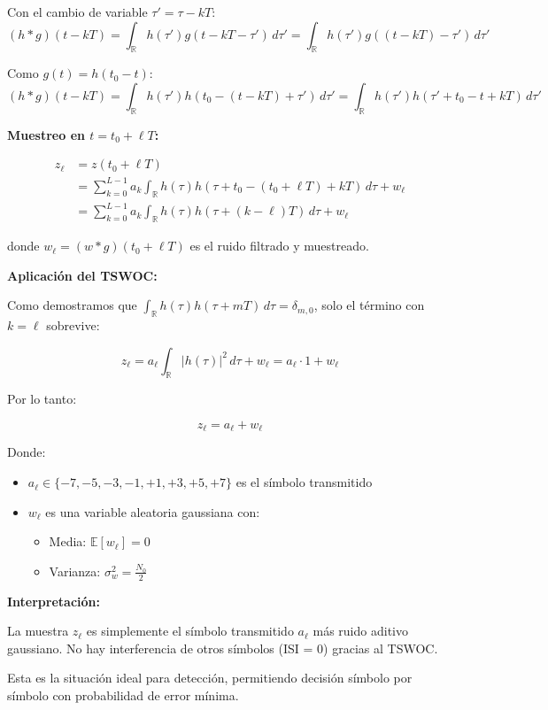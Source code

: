 \documentclass[11pt,a4paper]{article}
\begin{document}
Con el cambio de variable $\tau' = \tau - kT$:
\[
(h * g)(t-kT) = \int_{\mathbb{R}} h(\tau') g(t - kT - \tau')\, d\tau' = \int_{\mathbb{R}} h(\tau') g((t-kT) - \tau')\, d\tau'
\]

Como $g(t) = h(t_0 - t)$:
\[
(h * g)(t-kT) = \int_{\mathbb{R}} h(\tau') h(t_0 - (t - kT) + \tau')\, d\tau' = \int_{\mathbb{R}} h(\tau') h(\tau' + t_0 - t + kT)\, d\tau'
\]

\textbf{Muestreo en $t = t_0 + \ell T$:}

\begin{align*}
z_\ell &= z(t_0 + \ell T) \\
&= \sum_{k=0}^{L-1} a_k \int_{\mathbb{R}} h(\tau) h(\tau + t_0 - (t_0 + \ell T) + kT)\, d\tau + w_\ell \\
&= \sum_{k=0}^{L-1} a_k \int_{\mathbb{R}} h(\tau) h(\tau + (k - \ell)T)\, d\tau + w_\ell
\end{align*}

donde $w_\ell = (w * g)(t_0 + \ell T)$ es el ruido filtrado y muestreado.

\textbf{Aplicaci\'on del TSWOC:}

Como demostramos que $\int_{\mathbb{R}} h(\tau) h(\tau + mT)\, d\tau = \delta_{m,0}$, solo el t\'ermino con $k = \ell$ sobrevive:

\[
z_\ell = a_\ell \int_{\mathbb{R}} |h(\tau)|^2\, d\tau + w_\ell = a_\ell \cdot 1 + w_\ell
\]

Por lo tanto:

\[
\boxed{z_\ell = a_\ell + w_\ell}
\]

Donde:
\begin{itemize}
    \item $a_\ell \in \{-7, -5, -3, -1, +1, +3, +5, +7\}$ es el s\'imbolo transmitido
    \item $w_\ell$ es una variable aleatoria gaussiana con:
    \begin{itemize}
        \item Media: $\mathbb{E}[w_\ell] = 0$
        \item Varianza: $\sigma_w^2 = \frac{N_0}{2}$
    \end{itemize}
\end{itemize}

\textbf{Interpretaci\'on:}

La muestra $z_\ell$ es simplemente el s\'imbolo transmitido $a_\ell$ m\'as ruido aditivo gaussiano. No hay interferencia de otros s\'imbolos (ISI = 0) gracias al TSWOC.

Esta es la situaci\'on ideal para detecci\'on, permitiendo decisi\'on s\'imbolo por s\'imbolo con probabilidad de error m\'inima.
\end{document}
